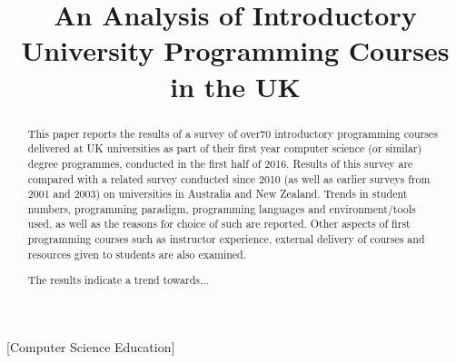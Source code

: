 \documentclass{sig-alternate}
\begin{document}
%

\title{An Analysis of Introductory University Programming Courses in the UK}
\iffalse
\numberofauthors{3}
\author{
\alignauthor
Ellen Murphy\\
\affaddr{Institute for\\Mathematical Innovation}\\
\affaddr{University of Bath}\\
\affaddr{e.murphy@bath.ac.uk}
\alignauthor
Tom Crick\\
\affaddr{Dept. of Computing}\\
\affaddr{Cardiff Metropolitan University}\\
\affaddr{tcrick@cardiffmet.ac.uk}
\alignauthor
James H. Davenport\\
\affaddr{Dept. of Computer Science}\\
\affaddr{University of Bath}\\
\affaddr{j.h.davenport@bath.ac.uk}\\
}
\fi
\maketitle

\begin{abstract}
This paper reports the results of a survey of over70 introductory
programming courses delivered at UK universities as part of their
first year computer science (or similar) degree programmes, conducted
in the first half of 2016. Results of this survey are compared with a
related survey conducted since 2010 (as well as earlier surveys from
2001 and 2003) on universities in Australia and New Zealand. Trends in
student numbers, programming paradigm, programming languages and
environment/tools used, as well as the reasons for choice of such are
reported. Other aspects of first programming courses such as
instructor experience, external delivery of courses and resources
given to students are also examined.

The results indicate a trend towards...
\end{abstract}

[Computer Science Education]
\end{document}
